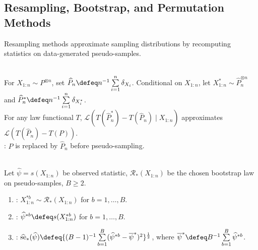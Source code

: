 \subsection{Resampling, Bootstrap, and Permutation Methods}

Resampling methods approximate sampling distributions by recomputing statistics on data-generated pseudo-samples.

\begin{definition} \label{def:nonparametric-bootstrap} \\
For $X_{1:n}\sim P^{\otimes n}$, set $\widehat{P}_n\defeq n^{-1}\sum\limits_{i=1}^{n}\delta_{X_i}$. Conditional on $X_{1:n}$, let $X_{1:n}^\ast\sim\widehat{P}_n^{\otimes n}$ and $\widehat{P}_n^\ast\defeq n^{-1}\sum\limits_{i=1}^{n}\delta_{X_i^\ast}$.\\
For any law functional $T$, $\mathcal{L}(T(\widehat{P}_n^\ast)-T(\widehat{P}_n)\mid X_{1:n})$ approximates $\mathcal{L}(T(\widehat{P}_n)-T(P))$.\\
: $P$ is replaced by $\widehat{P}_n$ before pseudo-sampling.
\end{definition}

\begin{method} \label{meth:bootstrap-standard-error} \\
Let $\widehat{\psi}=s(X_{1:n})$ be observed statistic, $\mathcal{R}_\ast(X_{1:n})$ be the chosen bootstrap law on pseudo-samples, $B\geq2$.
\begin{enumerate}[label=(\roman*)]
\setlength{\itemsep}{0pt}
\item {}: $X_{1:n}^{\ast b}\sim\mathcal{R}_\ast(X_{1:n})$ for $b=1,\ldots,B$.
\item {}: $\widehat{\psi}^{\ast b}\defeq s(X_{1:n}^{\ast b})$ for $b=1,\ldots,B$.
\item {}: $\widehat{\operatorname{se}}_\ast(\widehat{\psi})\defeq\{(B-1)^{-1}\sum\limits_{b=1}^{B}(\widehat{\psi}^{\ast b}-\overline{\psi}^{\ast})^2\}^{\frac{1}{2}}$, where $\overline{\psi}^{\ast}\defeq B^{-1}\sum\limits_{b=1}^{B}\widehat{\psi}^{\ast b}$.
\end{enumerate}
\end{method}

